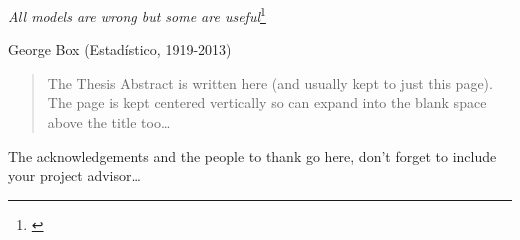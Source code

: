 \documentclass[
11pt, %
spanish, %
onehalfspacing, %
]{MastersDoctoralThesis_custom} %
\begin{document}

\vspace*{0.05\textheight}

\hfill\textit{\large All models are wrong but some are useful}\footnote{\cite{box1979robustness}}\bigbreak

\hfill George Box (Estadístico, 1919-2013)


\begin{abstract}
\addchaptertocentry{\abstractname} %

The Thesis Abstract is written here (and usually kept to just this page). The page is kept centered vertically so can expand into the blank space above the title too\ldots

\end{abstract}


\begin{acknowledgements}
\addchaptertocentry{\acknowledgementname} %

The acknowledgements and the people to thank go here, don't forget to include your project advisor\ldots

\end{acknowledgements}

\renewcommand{\contentsname}{Indice}
\tableofcontents %
\renewcommand{\figurename}{Figura}
\renewcommand{\tablename}{Tabla}


\end{document}

